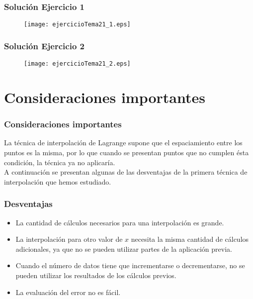 \begin{frame}
\frametitle{Solución Ejercicio 1}
\begin{figure}
	\centering
	\texttt{[image: ejercicioTema21\_1.eps]} 
\end{figure}
\end{frame}
\begin{frame}
\frametitle{Solución Ejercicio 2}
\begin{figure}
	\centering
	\texttt{[image: ejercicioTema21\_2.eps]} 
\end{figure}
\end{frame}
\section{Consideraciones importantes}
\begin{frame}
\frametitle{Consideraciones importantes}
La técnica de interpolación de Lagrange supone que el espaciamiento entre los puntos es la misma, por lo que cuando se presentan puntos que no cumplen ésta condición, la técnica ya no aplicaría.
\\
\bigskip
A continuación se presentan algunas de las desventajas de la primera técnica de interpolación que hemos estudiado.
\end{frame}
\begin{frame}
\frametitle{Desventajas}
\begin{itemize}
\item La cantidad de cálculos necesarios para una interpolación es grande.
\item La interpolación para otro valor de $x$ necesita la misma cantidad de cálculos adicionales, ya que no se pueden utilizar partes de la aplicación previa.
\item Cuando el número de datos tiene que incrementarse o decrementarse, no se pueden utilizar los resultados de los cálculos previos.
\item La evaluación del error no es fácil.
\end{itemize}
\end{frame}
